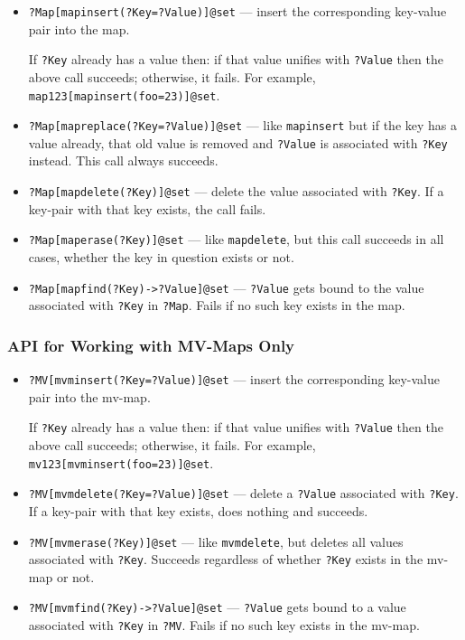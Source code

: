 \begin{itemize}
\item  \texttt{?Map[mapinsert(?Key=?Value)]@\bs{}set} --- insert the
  corresponding key-value pair into the map. 

  If \texttt{?Key} already has a value then: if that value unifies with
  \texttt{?Value} then the above call succeeds; otherwise, it fails.
  For example, \texttt{map123[mapinsert(foo=23)]@\bs{}set}. 
\item \texttt{?Map[mapreplace(?Key=?Value)]@\bs{}set} --- like
  \texttt{mapinsert} but if the key has a value already,
  that old value is removed and \texttt{?Value} is associated with
  \texttt{?Key} instead. This call always succeeds.
\item \texttt{?Map[mapdelete(?Key)]@\bs{}set} --- delete the value
  associated with \texttt{?Key}. If a key-pair with that key exists,
  the call fails.
\item \texttt{?Map[maperase(?Key)]@\bs{}set} --- like \texttt{mapdelete}, but
  this call succeeds in all cases, whether the key in question exists or
  not.
\item \texttt{?Map[mapfind(?Key)->?Value]@\bs{}set} --- \texttt{?Value}
  gets bound to the value associated with \texttt{?Key} in \texttt{?Map}.
  Fails if no such key exists in the map.
\end{itemize}

\subsubsection{API for Working with MV-Maps Only} \label{sec-api-mvmap}

\begin{itemize}
\item  \texttt{?MV[mvminsert(?Key=?Value)]@\bs{}set} --- insert the
  corresponding key-value pair into the mv-map. 

  If \texttt{?Key} already has a value then: if that value unifies with
  \texttt{?Value} then the above call succeeds; otherwise, it fails.
  For example, \texttt{mv123[mvminsert(foo=23)]@\bs{}set}. 
\item \texttt{?MV[mvmdelete(?Key=?Value)]@\bs{}set} --- delete a
  \texttt{?Value} 
  associated with \texttt{?Key}. If a key-pair with that key exists,
  does nothing and succeeds.
\item \texttt{?MV[mvmerase(?Key)]@\bs{}set} --- like \texttt{mvmdelete},  but
  deletes all values associated with \texttt{?Key}. Succeeds regardless
  of whether \texttt{?Key} exists in the mv-map or not.
\item \texttt{?MV[mvmfind(?Key)->?Value]@\bs{}set} --- \texttt{?Value}
  gets bound to a value associated with \texttt{?Key} in \texttt{?MV}.
  Fails if no such key exists in the mv-map.
\end{itemize}






